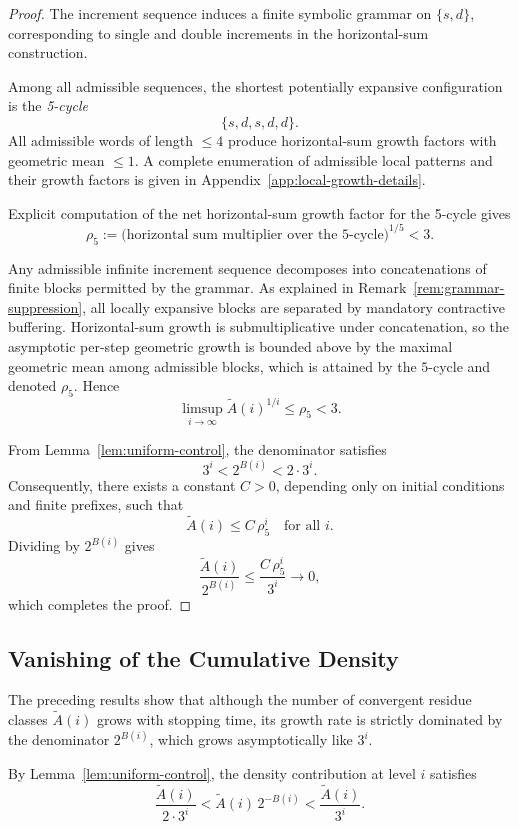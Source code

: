 \documentclass[12pt, oneside]{article}   	%
\numberwithin{equation}{section}          %
\theoremstyle{definition}
\begin{document}
\begin{proof}
The increment sequence  induces a finite symbolic grammar on $\{s,d\}$,
corresponding to single and double increments in the horizontal-sum construction.

Among all admissible sequences, the shortest potentially expansive configuration is the
\emph{5-cycle}
\[
\{s,d,s,d,d\}.
\]
All admissible words of length $\le 4$ produce horizontal-sum growth factors with
geometric mean $\le 1$. A complete enumeration of admissible local patterns and
their growth factors is given in Appendix~\ref{app:local-growth-details}.

Explicit computation of the net horizontal-sum growth factor for the 5-cycle gives
\[
\rho_5 := \bigl(\text{horizontal sum multiplier over the 5-cycle}\bigr)^{1/5} < 3.
\]

Any admissible infinite increment sequence decomposes into concatenations of finite
blocks permitted by the grammar. As explained in Remark~\ref{rem:grammar-suppression},
all locally expansive blocks are separated by mandatory contractive buffering. Horizontal-sum
growth is submultiplicative under concatenation, so the asymptotic per-step geometric
growth is bounded above by the maximal geometric mean among admissible blocks, which is
attained by the $5$-cycle and denoted $\rho_5$. Hence
\[
\limsup_{i\to\infty} \widetilde A(i)^{1/i} \le \rho_5 < 3.
\]

From Lemma~\ref{lem:uniform-control}, the denominator satisfies
\[
3^i < 2^{B(i)} < 2\cdot 3^i.
\]
Consequently, there exists a constant $C>0$, depending only on initial conditions
and finite prefixes, such that
\[
\widetilde A(i) \le C\,\rho_5^i \quad \text{for all } i.
\]
Dividing by $2^{B(i)}$ gives
\[
\frac{\widetilde A(i)}{2^{B(i)}} \le \frac{C\,\rho_5^i}{3^i} \longrightarrow 0,
\]
which completes the proof.
\end{proof}


\subsection{Vanishing of the Cumulative Density}

The preceding results show that although the number of convergent residue classes
$\widetilde A(i)$ grows with stopping time, its growth rate is strictly dominated
by the denominator $2^{B(i)}$, which grows asymptotically like $3^i$.

By Lemma~\ref{lem:uniform-control}, the density contribution at level $i$ satisfies
\[
\frac{\widetilde A(i)}{2 \cdot 3^i} < \widetilde A(i)\,2^{-B(i)} < \frac{\widetilde A(i)}{3^i}.
\]
\end{document}

